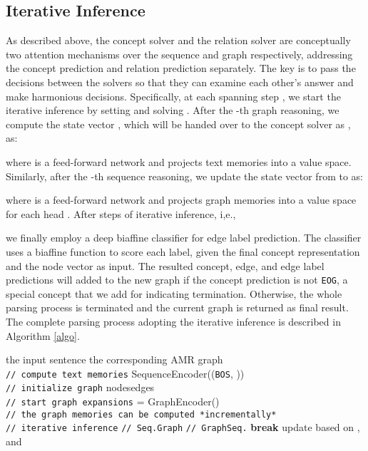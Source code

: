 \documentclass[11pt,a4paper]{article}
\begin{document}
	\subsection{Iterative Inference}
	As described above, the concept solver and the relation solver are conceptually two attention mechanisms over the sequence and graph respectively, addressing the concept prediction and relation prediction separately. The key is to pass the decisions between the solvers so that they can examine each other's answer and make harmonious decisions. Specifically, at each spanning step , we start the iterative inference by setting  and solving . After the -th graph reasoning, we compute the state vector , which will be handed over to the concept solver as , as:
	
	where  is a feed-forward network and  projects text memories into a value space. 
	Similarly, after the -th sequence reasoning, we update the state vector from  to  as:
	
	where  is a feed-forward network and  projects graph memories into a value space for each head . 
	After  steps of iterative inference, i,e., 
	
	we finally employ a deep biaffine classifier \cite{dozat2016deep} for edge label prediction. The classifier uses a biaffine function to score each label, given the final concept representation  and the node vector  as input. The resulted concept, edge, and edge label predictions will added to the new graph  if the concept prediction is not \texttt{EOG}, a special concept that we add for indicating termination. Otherwise, the whole parsing process is terminated and the current graph is returned as final result. The complete parsing process adopting the iterative inference is described in Algorithm \ref{algo}.
	
	\begin{algorithm}[t]
		\caption{AMR Parsing via Graph{\small }Sequence\\ Iterative Inference }
		\begin{algorithmic}[1]
			\REQUIRE the input sentence 
			\ENSURE the corresponding AMR graph  \\
			\texttt{// compute text memories}
			\STATE  SequenceEncoder((\texttt{BOS}, ))\\
			\texttt{// initialize graph}
			\STATE nodesedges\\
			\texttt{// start graph expansions}
			\STATE 
			\STATE  = GraphEncoder() \\
			\texttt{// the graph memories can be computed *incrementally*}
			\STATE \\
			\texttt{// iterative inference}
			\STATE  \texttt{// Seq.Graph}
			\STATE  \texttt{// GraphSeq.}
			\ENDFOR
			\STATE \textbf{break}
			\ENDIF
			\STATE update  based on ,  and 
			\STATE 
			\ENDWHILE
			\RETURN 
		\end{algorithmic}
		\label{algo}
	\end{algorithm}
\end{document}
